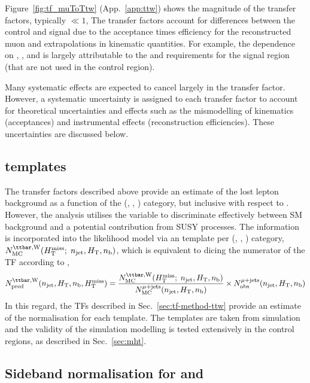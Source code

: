 Figure~\ref{fig:tf_muToTtw} (App.~\ref{app:ttw}) shows the magnitude
of the transfer factors, typically $\ll 1$, The transfer factors
account for differences between the \mj control and signal due to the
acceptance times efficiency for the reconstructed muon and
extrapolations in kinematic quantities. For example, the dependence on
\njet, \scalht, and \nb is largely attributable to the \alphat and
\bdphi requirements for the signal region (that are not used in the
\mj control region).

Many systematic effects are expected to cancel largely in the transfer
factor. However, a systematic uncertainty is assigned to each transfer
factor to account for theoretical uncertainties and effects such as
the mismodelling of kinematics (\eg acceptances) and instrumental
effects (\eg reconstruction efficiencies). These uncertainties are
discussed below. 

\subsection{\texorpdfstring{\mht}{MHT} templates}
\label{sec:mht-intro}

The transfer factors described above provide an estimate of the lost
lepton background as a function of the (\njet, \scalht, \nb) category,
but inclusive with respect to \mht. However, the analysis utilises the
\mht variable to discriminate effectively between SM background and
\eg a potential contribution from SUSY processes. The \HTmiss
information is incorporated into the likelihood model via an \mht
template per (\njet, \scalht, \nb) category, $N_{\rm
  MC}^{\ttw}(\HTmiss;\; \njet, \scalht, \nb)$, which is equivalent to
dicing the numerator of the TF according to \mht, \ie
\begin{equation}
  \label{equ:pred-method-mht}
  \npre^{\ttw}(\njet, \scalht, \nb, \HTmiss) = 
  \frac{N_{\rm MC}^{\ttw}(\HTmiss;\; \njet, \scalht, \nb)}{N_{\rm MC}^{\mj}(\njet, \scalht, \nb)} 
  \times 
  \nobs^{\mj}(\njet, \scalht, \nb)
\end{equation}
In this regard, the TFs described in Sec.~\ref{sec:tf-method-ttw}
provide an estimate of the normalisation for each \mht template. The
\HTmiss templates are taken from simulation and the validity of the
simulation modelling is tested extensively in the control regions, as
described in Sec.~\ref{sec:mht}. 

\subsection{Sideband normalisation for \texorpdfstring{\wj}{W+jets} and \texorpdfstring{\ttbar}{TTbar}} 
\label{sec:sideband-corrections}

